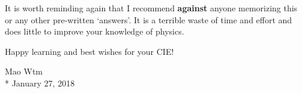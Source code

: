 It is worth reminding again that I recommend \textbf{against} anyone memorizing this or any other pre-written `answers'.
It is a terrible waste of time and effort and does little to improve your knowledge of physics.

Happy learning and best wishes for your CIE!

\null\hfill Mao Wtm\\*
\null\hfill January 27, 2018
\clearpage
